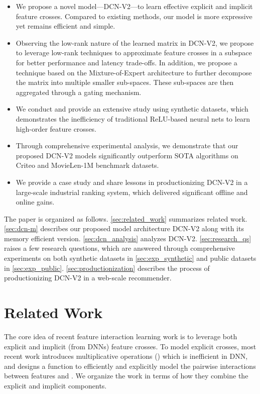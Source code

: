 \documentclass[sigconf]{acmart}
\begin{document}
\begin{itemize}[leftmargin=1em]
    \item We propose a novel model---{DCN-V2}---to learn effective explicit and implicit feature crosses. Compared to existing methods, our model is more expressive yet remains efficient and simple.
    \item Observing the low-rank nature of the learned matrix in {DCN-V2}, we propose to leverage low-rank techniques to approximate feature crosses in a subspace for better performance and latency trade-offs. In addition, we propose a technique based on the Mixture-of-Expert architecture \cite{shazeer2017outrageously, jacobs1991adaptive} to further decompose the matrix into multiple smaller sub-spaces. These sub-spaces are then aggregated through a gating mechanism.
    \item We conduct and provide an extensive study using synthetic datasets, which demonstrates the inefficiency of traditional ReLU-based neural nets to learn high-order feature crosses.
    \item Through comprehensive experimental analysis, we demonstrate that our proposed {DCN-V2} models significantly outperform SOTA algorithms on Criteo and MovieLen-1M benchmark datasets.
\item We provide a case study and share lessons in productionizing {DCN-V2} in a large-scale industrial ranking system, which delivered significant offline and online gains.
\end{itemize}


The paper is organized as follows. \autoref{sec:related_work} summarizes related work. \autoref{sec:dcn-m} describes our proposed model architecture {DCN-V2} along with its memory efficient version. \autoref{sec:dcn_analysis} analyzes {DCN-V2}. \autoref{sec:research_qs} raises a few research questions, which are answered through comprehensive experiments on both synthetic datasets in \autoref{sec:exp_synthetic} and public datasets in \autoref{sec:exp_public}. \autoref{sec:productionization} describes the process of productionizing {DCN-V2} in a web-scale recommender. 

\section{Related Work}
\label{sec:related_work}




The core idea of recent feature interaction learning work is to leverage both explicit and implicit (from DNNs) feature crosses. To model explicit crosses, most recent work introduces multiplicative operations () which is inefficient in DNN, and designs a function  to efficiently and explicitly model the pairwise interactions between features  and . We organize the work in terms of how they combine the explicit and implicit components.
\end{document}
